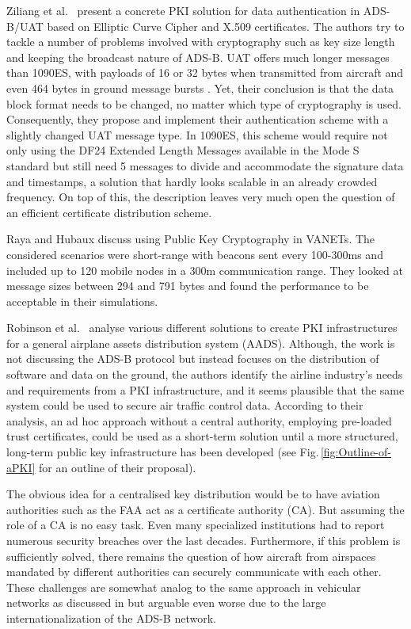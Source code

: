 \documentclass[english]{IEEEtran}
\begin{document}
Ziliang et al.~\cite{Ziliang2010} present a concrete PKI solution
for data authentication in ADS-B/UAT based on Elliptic Curve Cipher
and X.509 certificates. The authors try to tackle a number of problems
involved with cryptography such as key size length and keeping the
broadcast nature of ADS-B. UAT offers much longer messages than 1090ES,
with payloads of 16 or 32 bytes when transmitted from aircraft and
even 464 bytes in ground message bursts \cite{Moody2000}. Yet, their
conclusion is that the data block format needs to be changed, no matter
which type of cryptography is used. Consequently, they propose and
implement their authentication scheme with a slightly changed UAT
message type. In 1090ES, this scheme would require not only using
the DF24 Extended Length Messages available in the Mode S standard
but still need 5 messages to divide and accommodate the signature
data and timestamps, a solution that hardly looks scalable in an already
crowded frequency. On top of this, the description leaves very much
open the question of an efficient certificate distribution scheme.

Raya and Hubaux \cite{Raya2005,Raya2007} discuss using Public Key
Cryptography in VANETs. The considered scenarios were short-range
with beacons sent every 100-300ms and included up to 120 mobile nodes
in a 300m communication range. They looked at message sizes between
294 and 791 bytes and found the performance to be acceptable in their
simulations.

Robinson et al.~\cite{Robinson2007} analyse various different solutions
to create PKI infrastructures for a general airplane assets distribution
system (AADS). Although, the work is not discussing the ADS-B protocol
but instead focuses on the distribution of software and data on the
ground, the authors identify the airline industry's needs and requirements
from a PKI infrastructure, and it seems plausible that the same system
could be used to secure air traffic control data. According to their
analysis, an ad hoc approach without a central authority, employing
pre-loaded trust certificates, could be used as a short-term solution
until a more structured, long-term public key infrastructure has been
developed (see Fig.\,\ref{fig:Outline-of-aPKI} for an outline of
their proposal).

The obvious idea for a centralised key distribution would be to have
aviation authorities such as the FAA act as a certificate authority
(CA).\emph{ }But assuming the role of a CA is no easy task. Even many
specialized institutions had to report numerous security breaches
over the last decades. Furthermore, if this problem is sufficiently
solved, there remains the question of how aircraft from airspaces
mandated by different authorities can securely communicate with each
other. These challenges are somewhat analog to the same approach in
vehicular networks as discussed in \cite{Parno} but arguable even
worse due to the large internationalization of the ADS-B network.\\
\end{document}
